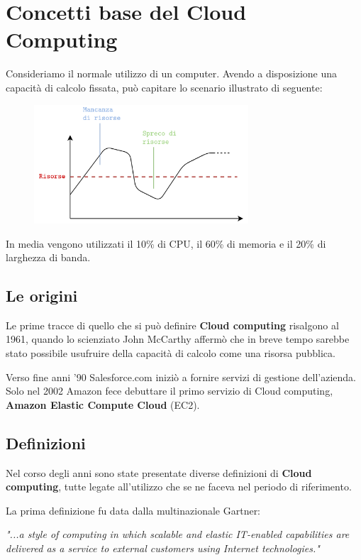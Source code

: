 \chapter{Concetti base del Cloud Computing}
Consideriamo il normale utilizzo di un computer. Avendo a disposizione una capacità di calcolo fissata, può capitare lo scenario illustrato di seguente:

\begin{figure}[ht]
    \centering
    \includegraphics[width=8cm]{./Images/cap2/2.1.png}
    \label{fig:image2.1}
\end{figure}

In media vengono utilizzati il 10\% di CPU, il 60\% di memoria e il 20\% di larghezza di banda.

\section{Le origini}
Le prime tracce di quello che si può definire \textbf{Cloud computing} risalgono al 1961, quando lo scienziato John McCarthy affermò che in breve tempo sarebbe stato possibile usufruire della capacità di calcolo come una risorsa pubblica.

Verso fine anni '90 Salesforce.com iniziò a fornire servizi di gestione dell'azienda. Solo nel 2002 Amazon fece debuttare il primo servizio di Cloud computing, \textbf{Amazon Elastic Compute Cloud} (EC2).

\section{Definizioni}
Nel corso degli anni sono state presentate diverse definizioni di \textbf{Cloud computing}, tutte legate all'utilizzo che se ne faceva nel periodo di riferimento. 

La prima definizione fu data dalla multinazionale Gartner:

\begin{displayquote}
\textit{"...a style of computing in which scalable and elastic IT-enabled capabilities are delivered as a service to external customers using Internet technologies."}
\end{displayquote}


